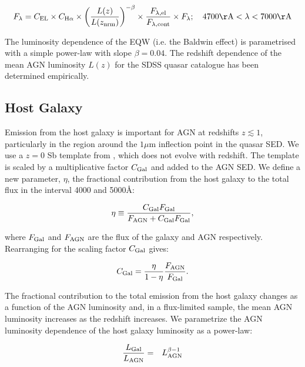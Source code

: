 \begin{equation}
  F_{\lambda} =  C_{\rm EL} \times C_{{\rm H} \alpha} \times \left( \frac{L(z)} {L(z_{\rm nrm})} \right)^{-\beta} \times \frac{F_{\lambda, \rm el}}{F_{\lambda, \rm cont}} \times F_{\lambda}; \quad 4700{\rm \AA} < \lambda < 7000{\rm \AA} 
\end{equation}

The luminosity dependence of the \ha EQW (i.e. the Baldwin effect) is parametrised with a simple power-law with slope $\beta=0.04$.
The redshift dependence of the mean \ac{AGN} luminosity $L(z)$ for the SDSS quasar catalogue has been determined empirically.

\subsection{Host Galaxy}

Emission from the host galaxy is important for \ac{AGN} at redshifts $z\lesssim1$, particularly in the region around the $1\mu$m inflection point in the quasar \ac{SED}. 
We use a $z=0$ Sb template from \citet{mannucci01}, which does not evolve with redshift.
The template is scaled by a multiplicative factor $C_{\rm Gal}$ and added to the \ac{AGN} \ac{SED}. 
We define a new parameter, $\eta$, the fractional contribution from the host galaxy to the total flux in the interval 4000 and 5000\AA:

\begin{eqnarray}
  \eta \equiv \frac{C_{\rm Gal}F_{\rm Gal}}{F_{\rm AGN} + C_{\rm Gal}F_{\rm Gal}},
\end{eqnarray}

where $F_{\rm Gal}$ and $F_{\rm AGN}$ are the flux of the galaxy and \ac{AGN} respectively. 
Rearranging for the scaling factor $C_{\rm Gal}$ gives:

\begin{eqnarray}
  C_{\rm Gal} = \frac{\eta}{1 - \eta} \frac{F_{\rm AGN}}{F_{\rm Gal}}.
\end{eqnarray}

The fractional contribution to the total emission from the host galaxy changes as a function of the \ac{AGN} luminosity and, in a flux-limited sample, the mean \ac{AGN} luminosity increases as the redshift increases. 
We parametrize the \ac{AGN} luminosity dependence of the host galaxy luminosity as a power-law:

\begin{eqnarray}
  \label{eq:lgal}
  \frac{L_{\rm Gal}}{L_{\rm AGN}} &=& L_{\rm AGN}^{\beta - 1} 
\end{eqnarray}


